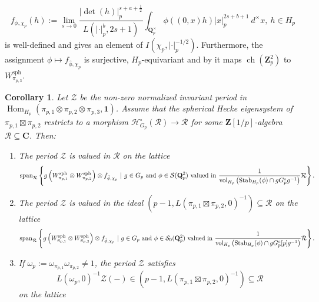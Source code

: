 \documentclass{amsart}%
\theoremstyle{plain}
\newtheorem{cor}[thm]{Corollary}
\newcommand\scalemath[2]{\scalebox{#1}{\mbox{\ensuremath{\displaystyle #2}}}}
\theoremstyle{plain}
\theoremstyle{remark}
\DeclareMathOperator{\ch}{ch}
\DeclareMathOperator{\Hom}{Hom}
\DeclareMathOperator{\vol}{vol}
\begin{document}
$$f_{\phi,\chi_p}(h):=\lim_{s\rightarrow 0} \frac{|\det(h)|_p^{s+a+\tfrac{1}{2}}}{L\left(|\cdot|_p^{b},2s+1\right)}\int_{\mathbf{Q}_p^\times}\phi((0,x)h)|x|_p^{2s+b+1}\ d^\times x,\ h\in H_p$$
is well-defined and gives an element of $I(\chi_p,|\cdot|_p^{-1/2})$. Furthermore, the assignment $\phi\mapsto f_{\hat{\phi},\chi_p}$ is surjective, $H_p$-equivariant and by \cite[Lemma $3.2.5$]{Loeffler_Skinner_Zerbes_2021} it maps $\ch(\mathbf{Z}_p^2)$ to $W_{\pi_{p,3}}^\mathrm{sph}$.
\begin{cor}
    Let $\mathcal{Z}$ be the non-zero normalized invariant period in $\Hom_{H_p}(\pi_{p,1}\otimes \pi_{p,2}\otimes \pi_{p,3},\mathbf{1})$. Assume that the spherical Hecke eigensystem of $\pi_{p,1}\boxtimes \pi_{p,2}$ restricts to a morphism $\mathcal{H}_{G_p}^\circ(\mathcal{R})\rightarrow\mathcal{R}$ for some $\mathbf{Z}[1/p]$-algebra $\mathcal{R}\subseteq\mathbf{C}$. Then:
    \begin{enumerate}
        \item The period $\mathcal{Z}$ is valued in $\mathcal{R}$ on the lattice 
        \begin{align*}
            \scalemath{0.9}{\mathrm{span}_{\mathcal{R}}\left\{ g\left(W_{\pi_{p,1}}^\mathrm{sph}\otimes W_{\pi_{p,2}}^\mathrm{sph}\right)\otimes f_{\hat{\phi},\chi_p}\ |\ g\in G_p\ \mathrm{and}\ \phi\in\mathcal{S}(\mathbf{Q}_p^2)\ \mathrm{valued}\ \mathrm{in}\ \frac{1}{\vol_{H_p}\left(\mathrm{Stab}_{H_p}(\phi)\cap g G_p^\circ g^{-1}\right)}\mathcal{R}\right\}.}
        \end{align*}
        \item The period $\mathcal{Z}$ is valued in the ideal $\left(p-1,L(\pi_{p,1}\boxtimes \pi_{p,2},0)^{-1}\right)\subseteq\mathcal{R}$ on the lattice 
        \begin{align*}
           \scalemath{0.9}{ \mathrm{span}_{\mathcal{R}}\left\{ g\left(W_{\pi_{p,1}}^\mathrm{sph}\otimes W_{\pi_{p,2}}^\mathrm{sph}\right)\otimes f_{\hat{\phi},\chi_p} \ |\ g\in G_p\ \mathrm{and}\ \phi\in\mathcal{S}_0(\mathbf{Q}_p^2)\ \mathrm{valued}\ \mathrm{in}\ \frac{1}{\vol_{H_p}\left(\mathrm{Stab}_{H_p}(\phi)\cap g G_p^\circ[p] g^{-1}\right)}\mathcal{R}\right\}.}
        \end{align*}
        \item If $\omega_p:=\omega_{\pi_{p,1}}\omega_{\pi_{p,2}}\neq 1$, the period $\mathcal{Z}$ satisfies
        $$L(\omega_p,0)^{-1}\mathcal{Z}(-)\in \left(p-1,L(\pi_{p,1}\boxtimes \pi_{p,2},0)^{-1}\right)\subseteq\mathcal{R}$$
        on the lattice
        \begin{align*}

\end{align*}
\end{enumerate}
\end{cor}
\end{document}
